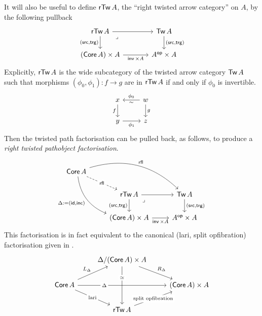 It will also be useful to define $\mathop{\mathsf{rTw}}{A}$,
the ``right twisted arrow category'' on $A$,
by the following pullback
\[ \begin{tikzcd}[column sep = large]
	{\rTw{A}} & {\Tw{A}} \\
	{(\Core{A}) \times A} & {{A}^\op \times A}
	\arrow[from=1-1, to=1-2]
	\arrow["{(\src,\trg)}"', from=1-1, to=2-1]
	\arrow["\lrcorner"{anchor=center, pos=0.125}, draw=none, from=1-1, to=2-2]
	\arrow["{(\src,\trg)}", from=1-2, to=2-2]
	\arrow["{\inv \times A}"', from=2-1, to=2-2]
\end{tikzcd} \]
Explicitly,
$\mathop{\mathsf{rTw}}{A}$ is the wide subcategory of the twisted arrow category $\mathop{\mathsf{Tw}}{A}$
such that morphisms $(\phi_0,\phi_1) : f \to g$ are in $\mathop{\mathsf{rTw}}{A}$
if and only if $\phi_0$ is invertible.
\[
\begin{tikzcd}
	x & w \\
	y & z
	\arrow["f"', from=1-1, to=2-1]
	\arrow["{\phi_0}"', from=1-2, to=1-1]
	\arrow["\sim", draw=none, from=1-2, to=1-1]
	\arrow["g", from=1-2, to=2-2]
	\arrow["{\phi_1}"', from=2-1, to=2-2]
\end{tikzcd}
\]
Then the twisted path factorisation can be pulled back, as follows,
to produce a \emph{right twisted pathobject factorisation}.
\begin{equation} \label{eq:global-right-twisted}
\begin{tikzcd}
	{\Core{A}} && \\
	& {\rTw{A}} & {\Tw{A}} \\
	& {(\Core{A}) \times A} & {{A}^\op \times A}
	\arrow["\rfl"{description}, dashed, from=1-1, to=2-2]
	\arrow["\rfl", bend left, from=1-1, to=2-3]
	\arrow["{\Delta := (\id, \inc)}"', bend right, from=1-1, to=3-2]
	\arrow[from=2-2, to=2-3]
	\arrow["{(\src,\trg)}"', from=2-2, to=3-2]
	\arrow["\lrcorner"{anchor=center, pos=0.125}, draw=none, from=2-2, to=3-3]
	\arrow["{(\src,\trg)}", from=2-3, to=3-3]
	\arrow["{\inv \times A}"', from=3-2, to=3-3]
\end{tikzcd}
\end{equation}
This factorisation is in fact equivalent to the canonical (lari, split opfibration)
factorisation given in .
\[
\begin{tikzcd}
	& {\Delta / (\Core{A}) \times A} & \\
	{\Core{A}} && {(\Core{A}) \times A} \\
	& {\rTw{A}}
	\arrow["{R_\Delta}", from=1-2, to=2-3]
	\arrow["\simeq"{description, pos=0.3}, from=1-2, to=3-2]
	\arrow["{L_\Delta}", from=2-1, to=1-2]
	\arrow["{{\Delta}}"{description, pos=0.3}, from=2-1, to=2-3]
	\arrow["{{\text{lari}}}"{description}, from=2-1, to=3-2]
	\arrow["{{{\text{split opfibration}}}}"{description}, from=3-2, to=2-3]
\end{tikzcd}
\]

